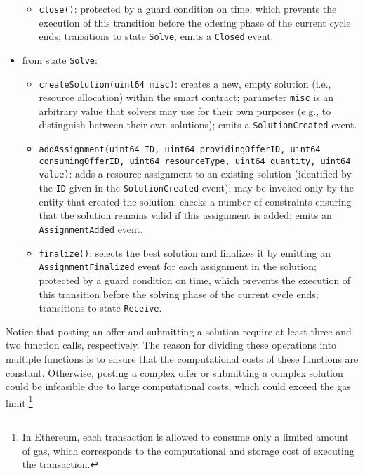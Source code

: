 \begin{itemize}[leftmargin=1em, noitemsep]
\begin{itemize}[noitemsep, leftmargin=0.5em]
        \item \texttt{close()}: protected by a  guard condition on time, which prevents the execution of this transition before the offering phase of the current cycle ends; transitions to state \texttt{Solve}; emits a \texttt{Closed} event.
    \end{itemize}
    \item from state \texttt{Solve}:
    \begin{itemize}[noitemsep, leftmargin=0.5em]
        \item \texttt{createSolution(uint64 misc)}: creates a new, empty solution (i.e., resource allocation) within the smart contract; parameter \texttt{misc} is an arbitrary value that solvers may use for their own purposes (e.g., to distinguish between their own solutions); emits a \texttt{SolutionCreated} event.
        \item \texttt{addAssignment(uint64 ID, uint64 providingOfferID, uint64 consumingOfferID, uint64 resourceType, uint64 quantity, uint64 value)}: adds a resource assignment to an existing solution (identified by the \texttt{ID} given in the \texttt{SolutionCreated} event); may be invoked only by the entity that created the solution; checks a number of constraints ensuring that the solution remains valid if this assignment is added; emits an \texttt{AssignmentAdded} event.
        \item \texttt{finalize()}: selects the best solution and finalizes it by emitting an \texttt{AssignmentFinalized} event for each assignment in the solution; protected by a guard condition on time, which prevents the execution of this transition before the solving phase of the current cycle ends; transitions to state \texttt{Receive}.
    \end{itemize}
\end{itemize}
Notice that posting an offer and submitting a solution require at least three and two function calls, respectively.
The reason for dividing these operations into multiple functions is to ensure that the computational costs of these functions are constant.
Otherwise, posting a complex offer or submitting a complex solution could be infeasible due to large computational costs, which could exceed the gas limit.\footnote{In Ethereum, each transaction is allowed to consume only a limited amount of gas, which corresponds to the computational and storage cost of executing the transaction.}



